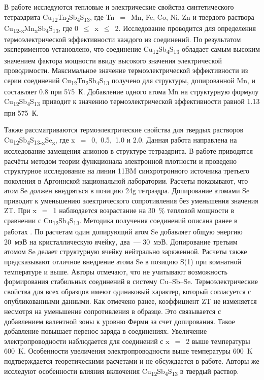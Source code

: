 В работе \cite{Heo2014} исследуются тепловые и электрические свойства синтетического тетраэдрита Cu\textsubscript{12}Tn\textsubscript{2}Sb\textsubscript{4}S\textsubscript{13}, где Tn~$=$~Mn, Fe, Co, Ni, Zn и твердого раствора Cu\textsubscript{12-x}Mn\textsubscript{x}Sb\textsubscript{4}S\textsubscript{13}, где 0~$\leq$~x~$\leq$~2. Исследование проводится для определения термоэлектрической эффективности каждого из соединений. По результатом экспериментов установлено, что соединение Cu\textsubscript{12}Sb\textsubscript{4}S\textsubscript{13} обладает самым высоким значением фактора мощности ввиду высокого значения электрической проводимости. Максимальное значение термоэлектрической эффективности из серии соединений Cu\textsubscript{12}Tn\textsubscript{2}Sb\textsubscript{4}S\textsubscript{13} получено для структуры, допированной Mn, и составляет 0.8 при 575~К. Добавление одного атома  Mn на структурную формулу Cu\textsubscript{12}Sb\textsubscript{4}S\textsubscript{13} приводит к значению термоэлектрической эффективности равной 1.13 при 575~К.

Также рассматриваются термоэлектрические свойства для твердых растворов Cu\textsubscript{12}Sb\textsubscript{4}S\textsubscript{13-x}Se\textsubscript{x}, где x~$=$~0,~0.5,~1.0 и 2.0\cite{Lu2016}.
Данная работа направлена на исследование замещения анионов в структуре тетраэдрита.
В работе приводятся расчёты методом теории функционала электронной плотности и проведено структурное исследование на линии 11BM  синхротронного источника третьего поколения в Аргоннской национальной лаборатории.
Расчеты показывают, что атом Se должен внедряться в позицию 24g тетраэдра.
Допирование атомами Se приводит к уменьшению электрического сопротивления без уменьшения значения ZT.
При x~$=$~1 наблюдается возрастание на 30~\% тепловой мощности в сравнении с Cu\textsubscript{12}Sb\textsubscript{4}S\textsubscript{13}.
Методика получения соединений описана ранее в работах \cite{Lu2013,Lu_2013b,Lu_2013}. По расчетам один допирующий атом Se  добавляет общую энергию 20~мэВ на кристаллическую ячейку, два~--- 30~мэВ.
Допирование третьим атомом Se делает структурную ячейку нейтрально заряженной. Расчеты также предсказывают отличное внедрение атома Se в позицию S(1) при комнатной температуре и выше. Авторы отмечают, что не учитывают возможность формирования стабильных соединений в систему Cu--Sb--Se.
Термоэлектрические свойства для всех образцов имеют одинаковый характер, который согласуется с опубликованными данными.
Как отмечено ранее, коэффициент ZT не изменяется несмотря на уменьшение сопротивления в образце.
Это связывается с добавлением  валентной зоны к уровню Ферми за счет допирования.
Такое добавление повышает перенос заряда в соединениях.
Увеличение электропроводности наблюдается для соединений с  x~$=$~2 выше температуры 600~K. Особенности увеличения электропроводности выше температуры 600~K подтверждается теоретическими расчетами и не обсуждается в работе.
Авторы же исследуют особенности влияния включения Cu\textsubscript{12}Sb\textsubscript{4}S\textsubscript{13} в твердый раствор.

